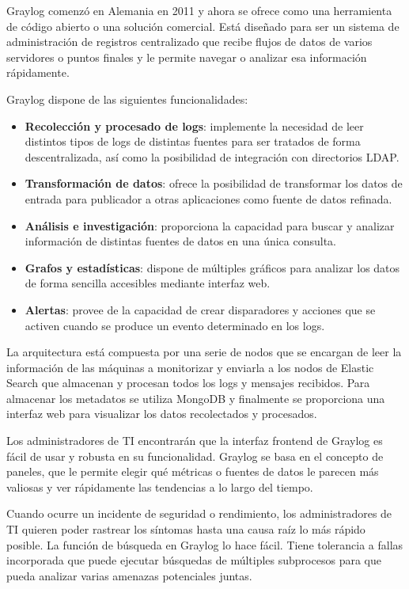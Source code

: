 Graylog comenzó en Alemania en 2011 y ahora se ofrece como una herramienta de código abierto o una solución comercial. Está diseñado para ser un sistema de administración de registros centralizado que recibe flujos de datos de varios servidores o puntos finales y le permite navegar o analizar esa información rápidamente.

Graylog dispone de las siguientes funcionalidades:

\begin{itemize}
\item \textbf{Recolección y procesado de logs}: implemente la necesidad de leer distintos tipos de logs de distintas fuentes para ser tratados de forma descentralizada, así como la posibilidad de integración con directorios LDAP.

\item \textbf{Transformación de datos}: ofrece la posibilidad de transformar los datos de entrada para publicador a otras aplicaciones como fuente de datos refinada.

\item \textbf{Análisis e investigación}: proporciona la capacidad para buscar y analizar información  de distintas fuentes de datos en una única consulta.

\item \textbf{Grafos y estadísticas}: dispone de múltiples gráficos para analizar los datos de forma sencilla accesibles mediante interfaz web.

\item \textbf{Alertas}: provee de la capacidad de crear disparadores y acciones que se activen cuando se produce un evento determinado en los logs. 
\end{itemize}

La arquitectura está compuesta por una serie de nodos que se encargan de leer la información de las máquinas a monitorizar y enviarla a los nodos de Elastic Search que almacenan y procesan todos los logs y mensajes recibidos. Para almacenar los metadatos se utiliza MongoDB y finalmente se proporciona una interfaz web para visualizar los datos recolectados y procesados.

Los administradores de TI encontrarán que la interfaz frontend de Graylog es fácil de usar y robusta en su funcionalidad. Graylog se basa en el concepto de paneles, que le permite elegir qué métricas o fuentes de datos le parecen más valiosas y ver rápidamente las tendencias a lo largo del tiempo.

Cuando ocurre un incidente de seguridad o rendimiento, los administradores de TI quieren poder rastrear los síntomas hasta una causa raíz lo más rápido posible. La función de búsqueda en Graylog lo hace fácil. Tiene tolerancia a fallas incorporada que puede ejecutar búsquedas de múltiples subprocesos para que pueda analizar varias amenazas potenciales juntas.

